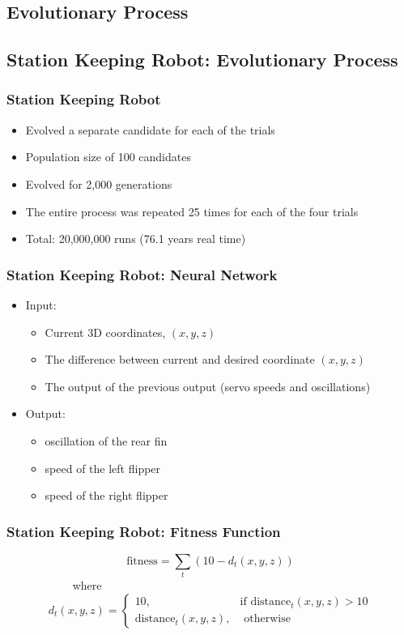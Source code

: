 \documentclass{beamer}
\begin{document}
\begin{frame}
\section{Evolutionary Process}

\subsection*{Station Keeping Robot: Evolutionary Process}
\begin{frame}
  \frametitle{Station Keeping Robot}
\begin{itemize}
\item Evolved a separate candidate for each of the trials
\item Population size of 100 candidates
\item Evolved for 2,000 generations
\item The entire process was repeated 25 times for each of the four trials
\item Total: 20,000,000 runs (76.1 years real time)
\end{itemize}
\end{frame}

\begin{frame}
  \frametitle{Station Keeping Robot: Neural Network}
\begin{itemize}
\item Input: 
\begin{itemize}
\item Current 3D coordinates, $(x,y,z)$
\item The difference between current and desired coordinate  $(x,y,z)$
\item The output of the previous output (servo speeds and oscillations)
\end{itemize}
\item Output:
\begin{itemize}
\item oscillation of the rear fin
\item speed of the left flipper
\item speed of the right flipper
\end{itemize}
\end{itemize}
\end{frame}

\begin{frame}
  \frametitle{Station Keeping Robot: Fitness Function}
\begin{equation*}
	\textrm{fitness} = \sum_{t} (10 - d_t(x, y, z))
\end{equation*}
~~~~~~~~~~~  where
\[
	d_t(x, y, z) = 
		\begin{cases} 10, & \textrm{if distance}_t(x, y, z) > 10 \\
					  \textrm{distance}_t(x, y, z), & \textrm{ otherwise}
		\end{cases}
\]
\end{frame}


\end{frame}
\end{document}
